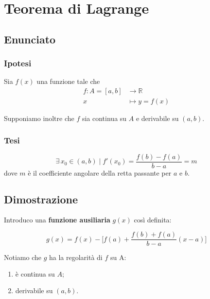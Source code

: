 \documentclass[../dimostrazioni]{subfiles}
\begin{document}
    \chapter{Teorema di Lagrange}
    \label{teoLagrange}

        \section*{Enunciato}

            \subsection*{Ipotesi}

                Sia \(f(x)\) una funzione tale che
                \begin{align*}
                    f : A = [a, b] &\longrightarrow \mathbb{R}\\
                    x &\longmapsto y = f(x) 
                \end{align*}

                Supponiamo inoltre che \(f\) sia continua su \(A\) e derivabile su \((a, b)\).

            \subsection*{Tesi}

                \[ \exists \, x_0 \in (a,b) \; | \; f'(x_0) = \frac{f(b)-f(a)}{b-a}=m \]
                dove \(m\) è il coefficiente angolare della retta passante per \(a\) e \(b\).

        \section*{Dimostrazione}

            Introduco una \textbf{funzione ausiliaria} \(g(x)\) così definita:

            \[ g(x) = f(x) - \bigg[f(a) + \frac{f(b) + f(a)}{b - a}(x - a) \bigg] \]

            Notiamo che \(g\) ha la regolarità di \(f\) su A:
            \begin{enumerate}
                \indentitem \item è continua su \( A \);
                \indentitem \item derivabile su \( (a, b) \).
            \end{enumerate}
\end{document}
